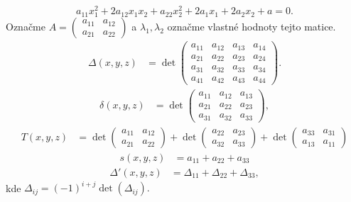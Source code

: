 \[ a_{11}x_1^2 + 2a_{12}x_1x_2 + a_{22}x_2^2 + 2a_1x_1 + 2a_2x_2 + a = 0. \]
Označme
\(A = \begin{pmatrix} a_{11} & a_{12} \\ a_{21} & a_{22} \end{pmatrix}\)
 a \(\lambda_1, \lambda_2\) označme vlastné hodnoty tejto matice.
\begin{align*}
\Delta(x, y, z) &= \det \begin{pmatrix} 
a_{11} & a_{12} & a_{13} & a_{14} \\ 
a_{21} & a_{22} & a_{23} & a_{24} \\
a_{31} & a_{32} & a_{33} & a_{34} \\
a_{41} & a_{42} & a_{43} & a_{44}
\end{pmatrix}.
\end{align*}
\begin{align*}
\delta(x, y, z) &= \det \begin{pmatrix} 
a_{11} & a_{12} & a_{13} \\ 
a_{21} & a_{22} & a_{23} \\ 
a_{31} & a_{32} & a_{33} 
\end{pmatrix},
\end{align*}
\begin{align*}
T(x, y, z) &= \det \begin{pmatrix} 
a_{11} & a_{12} \\ 
a_{21} & a_{22} 
\end{pmatrix} + \det \begin{pmatrix} 
a_{22} & a_{23} \\ 
a_{32} & a_{33} 
\end{pmatrix} + \det \begin{pmatrix} 
a_{33} & a_{31} \\ 
a_{13} & a_{11} 
\end{pmatrix}
\end{align*}
\begin{align*}
s(x, y, z) &= a_{11} + a_{22} + a_{33}
\end{align*}
\begin{align*}
\Delta'(x, y, z) &= \Delta_{11} + \Delta_{22} + \Delta_{33}, 
\end{align*}
kde $
\Delta_{ij} = (-1)^{i+j} \det(\Delta_{ij}).
$
